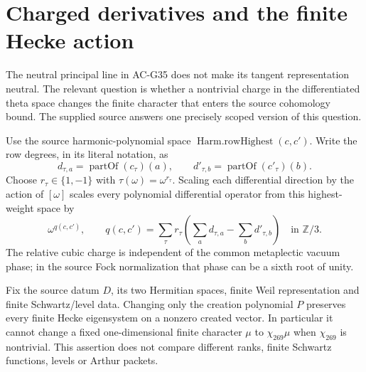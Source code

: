 \section{Charged derivatives and the finite Hecke action}
\label{sec:charged-theta-interface}

The neutral principal line in AC-G35 does not make its tangent
representation neutral.  The relevant question is whether a
nontrivial charge in the differentiated theta space changes
the finite character that enters the source cohomology bound.
The supplied source answers one precisely scoped version of
this question.

\begin{proposition}
\label{AC-G36}
Use the source harmonic-polynomial space
$\operatorname{Harm.rowHighest}(c,c')$.
Write the row degrees, in its literal notation, as
\[
 d_{\tau,a}=\operatorname{partOf}(c_\tau)(a),\qquad
 d'_{\tau,b}=\operatorname{partOf}(c'_\tau)(b).
\]
Choose $r_\tau\in\{1,-1\}$ with
$\tau(\omega)=\omega^{r_\tau}$.
Scaling each differential direction by the action of
$[\omega]$ scales every polynomial differential operator
from this highest-weight space by
\[
 \omega^{q(c,c')},\qquad
 q(c,c')=\sum_\tau r_\tau
       \left(\sum_a d_{\tau,a}-\sum_b d'_{\tau,b}\right)
                        \quad\text{in }\mathbb Z/3.   \tag{G36.1}
\]
The relative cubic charge is independent of the common
metaplectic vacuum phase; in the source Fock normalization
that phase can be a sixth root of unity.

Fix the source datum $D$, its two Hermitian spaces, finite
Weil representation and finite Schwartz/level data.
Changing only the creation polynomial $P$ preserves every
finite Hecke eigensystem on a nonzero created vector.
In particular it cannot change a fixed one-dimensional
finite character $\mu$ to $\chi_{269}\mu$ when
$\chi_{269}$ is nontrivial.
This assertion does not compare different ranks, finite
Schwartz functions, levels or Arthur packets.
\end{proposition}
